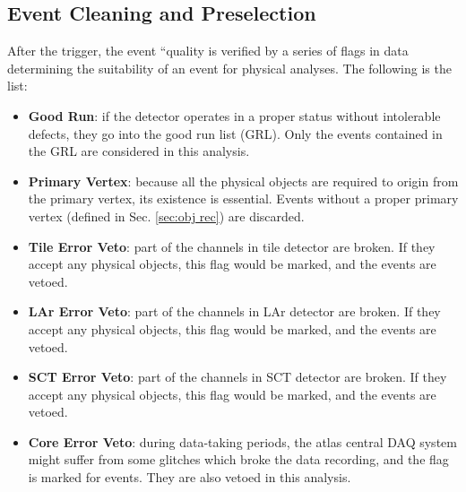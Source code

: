 \subsection{Event Cleaning and Preselection}
After the trigger, the event ``quality is verified by a series of flags in data determining the suitability of an event for physical analyses. The following is the list:
\begin{itemize}
	\item {\bf Good Run}: if the detector operates in a proper status without intolerable defects, they go into the good run list (GRL). Only the events contained in the GRL are considered in this analysis. 
	\item {\bf Primary Vertex}: because all the physical objects are required to origin from the primary vertex, its existence is essential. Events without a proper primary vertex (defined in Sec. \ref{sec:obj rec}) are discarded.
	\item {\bf Tile Error Veto}: part of the channels in tile detector are broken. If they accept any physical objects, this flag would be marked, and the events are vetoed.
	\item {\bf LAr Error Veto}: part of the channels in LAr detector are broken. If they accept any physical objects, this flag would be marked, and the events are vetoed.
	\item {\bf SCT Error Veto}: part of the channels in SCT detector are broken. If they accept any physical objects, this flag would be marked, and the events are vetoed.
	\item {\bf Core Error Veto}: during data-taking periods, the atlas central DAQ system might suffer from some glitches which broke the data recording, and the flag is marked for events. They are also vetoed in this analysis. 
\end{itemize}
